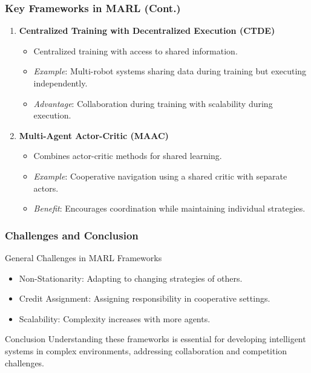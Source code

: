 \documentclass[aspectratio=169]{beamer}
\begin{document}
\begin{frame}[fragile]
    \frametitle{Key Frameworks in MARL (Cont.)}
    \begin{enumerate}[resume]
        \item \textbf{Centralized Training with Decentralized Execution (CTDE)}
        \begin{itemize}
            \item Centralized training with access to shared information.
            \item \textit{Example}: Multi-robot systems sharing data during training but executing independently.
            \item \textit{Advantage}: Collaboration during training with scalability during execution.
        \end{itemize}

        \item \textbf{Multi-Agent Actor-Critic (MAAC)}
        \begin{itemize}
            \item Combines actor-critic methods for shared learning.
            \item \textit{Example}: Cooperative navigation using a shared critic with separate actors.
            \item \textit{Benefit}: Encourages coordination while maintaining individual strategies.
        \end{itemize}
    \end{enumerate}
\end{frame}

\begin{frame}[fragile]
    \frametitle{Challenges and Conclusion}
    \begin{block}{General Challenges in MARL Frameworks}
        \begin{itemize}
            \item Non-Stationarity: Adapting to changing strategies of others.
            \item Credit Assignment: Assigning responsibility in cooperative settings.
            \item Scalability: Complexity increases with more agents.
        \end{itemize}
    \end{block}
    \begin{block}{Conclusion}
        Understanding these frameworks is essential for developing intelligent systems in complex environments, addressing collaboration and competition challenges.
    \end{block}
\end{frame}
\end{document}
